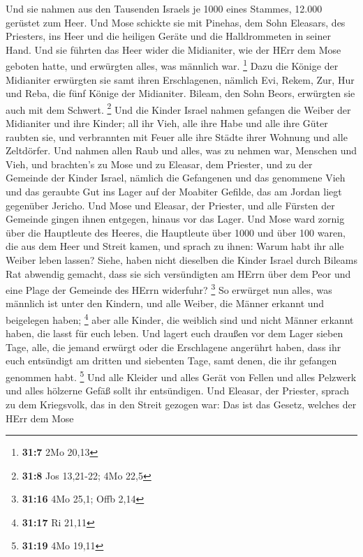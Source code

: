  Und sie nahmen aus den Tausenden Israels je 1000 eines
Stammes, 12.000 gerüstet zum Heer.  Und Mose schickte sie
mit Pinehas, dem Sohn Eleasars, des Priesters, ins Heer und die heiligen
Geräte und die Halldrommeten in seiner Hand.  Und sie
führten das Heer wider die Midianiter, wie der HErr dem Mose geboten
hatte, und erwürgten alles, was männlich war. \footnote{\textbf{31:7}
  2Mo 20,13}  Dazu die Könige der Midianiter erwürgten sie
samt ihren Erschlagenen, nämlich Evi, Rekem, Zur, Hur und Reba, die fünf
Könige der Midianiter. Bileam, den Sohn Beors, erwürgten sie auch mit
dem Schwert. \footnote{\textbf{31:8} Jos 13,21-22; 4Mo 22,5}
 Und die Kinder Israel nahmen gefangen die Weiber der
Midianiter und ihre Kinder; all ihr Vieh, alle ihre Habe und alle ihre
Güter raubten sie,  und verbrannten mit Feuer alle ihre
Städte ihrer Wohnung und alle Zeltdörfer.  Und nahmen allen
Raub und alles, was zu nehmen war, Menschen und Vieh,  und
brachten's zu Mose und zu Eleasar, dem Priester, und zu der Gemeinde der
Kinder Israel, nämlich die Gefangenen und das genommene Vieh und das
geraubte Gut ins Lager auf der Moabiter Gefilde, das am Jordan liegt
gegenüber Jericho.  Und Mose und Eleasar, der Priester, und
alle Fürsten der Gemeinde gingen ihnen entgegen, hinaus vor das Lager.
 Und Mose ward zornig über die Hauptleute des Heeres, die
Hauptleute über 1000 und über 100 waren, die aus dem Heer und Streit
kamen,  und sprach zu ihnen: Warum habt ihr alle Weiber
leben lassen?  Siehe, haben nicht dieselben die Kinder
Israel durch Bileams Rat abwendig gemacht, dass sie sich versündigten am
HErrn über dem Peor und eine Plage der Gemeinde des HErrn widerfuhr?
\footnote{\textbf{31:16} 4Mo 25,1; Offb 2,14}  So erwürget
nun alles, was männlich ist unter den Kindern, und alle Weiber, die
Männer erkannt und beigelegen haben; \footnote{\textbf{31:17} Ri 21,11}
 aber alle Kinder, die weiblich sind und nicht Männer
erkannt haben, die lasst für euch leben.  Und lagert euch
draußen vor dem Lager sieben Tage, alle, die jemand erwürgt oder die
Erschlagene angerührt haben, dass ihr euch entsündigt am dritten und
siebenten Tage, samt denen, die ihr gefangen genommen habt. \footnote{\textbf{31:19}
  4Mo 19,11}  Und alle Kleider und alles Gerät von Fellen
und alles Pelzwerk und alles hölzerne Gefäß sollt ihr entsündigen.
 Und Eleasar, der Priester, sprach zu dem Kriegsvolk, das
in den Streit gezogen war: Das ist das Gesetz, welches der HErr dem Mose
